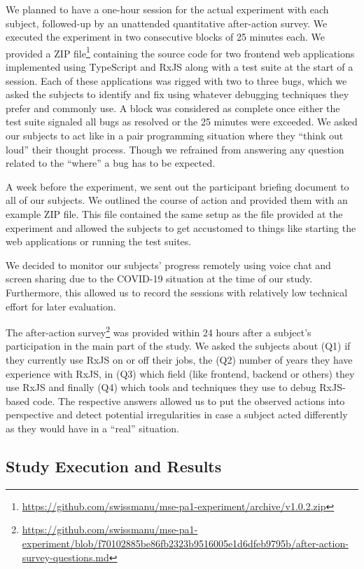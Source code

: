 \documentclass[12pt,a4paper]{article}
\begin{document}
We planned to have a one-hour session for the actual experiment with each subject, followed-up by an unattended quantitative after-action survey. We executed the experiment in two consecutive blocks of 25 minutes each. We provided a ZIP file\footnote{\url{https://github.com/swissmanu/mse-pa1-experiment/archive/v1.0.2.zip}} containing the source code for two frontend web applications implemented using TypeScript and RxJS along with a test suite at the start of a session. Each of these applications was rigged with two to three bugs, which we asked the subjects to identify and fix using whatever debugging techniques they prefer and commonly use. A block was considered as complete once either the test suite signaled all bugs as resolved or the 25 minutes were exceeded. We asked our subjects to act like in a pair programming situation where they ``think out loud'' their thought process. Though we refrained from answering any question related to the ``where'' a bug has to be expected.

A week before the experiment, we sent out the participant briefing document to all of our subjects. We outlined the course of action and provided them with an example ZIP file. This file contained the same setup as the file provided at the experiment and allowed the subjects to get accustomed to things like starting the web applications or running the test suites.

We decided to monitor our subjects' progress remotely using voice chat and screen sharing due to the COVID-19 situation at the time of our study. Furthermore, this allowed us to record the sessions with relatively low technical effort for later evaluation.

The after-action survey\footnote{\url{https://github.com/swissmanu/mse-pa1-experiment/blob/f70102885be86fb2323b9516005e1d6dfeb9795b/after-action-survey-questions.md}} was provided within 24 hours after a subject's participation in the main part of the study. We asked the subjects about (Q1) if they currently use RxJS on or off their jobs, the (Q2) number of years they have experience with RxJS, in (Q3) which field (like frontend, backend or others) they use RxJS and finally (Q4) which tools and techniques they use to debug RxJS-based code. The respective answers allowed us to put the observed actions into perspective and detect potential irregularities in case a subject acted differently as they would have in a ``real'' situation.

\subsection{Study Execution and Results}
\end{document}
